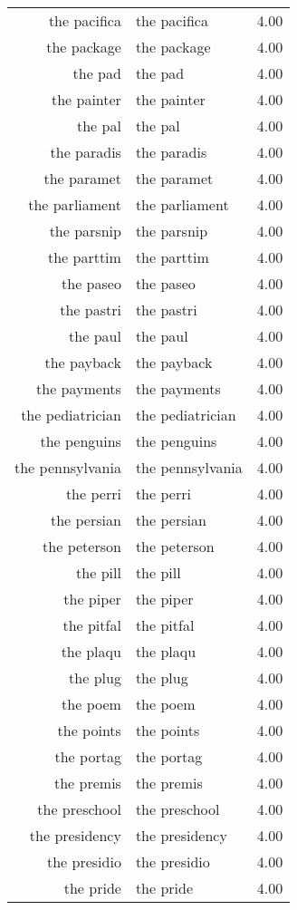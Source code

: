 \begin{table}[ht]
\begin{tabular}{rlr}
  the pacifica & the pacifica & 4.00 \\ 
  the package & the package & 4.00 \\ 
  the pad & the pad & 4.00 \\ 
  the painter & the painter & 4.00 \\ 
  the pal & the pal & 4.00 \\ 
  the paradis & the paradis & 4.00 \\ 
  the paramet & the paramet & 4.00 \\ 
  the parliament & the parliament & 4.00 \\ 
  the parsnip & the parsnip & 4.00 \\ 
  the parttim & the parttim & 4.00 \\ 
  the paseo & the paseo & 4.00 \\ 
  the pastri & the pastri & 4.00 \\ 
  the paul & the paul & 4.00 \\ 
  the payback & the payback & 4.00 \\ 
  the payments & the payments & 4.00 \\ 
  the pediatrician & the pediatrician & 4.00 \\ 
  the penguins & the penguins & 4.00 \\ 
  the pennsylvania & the pennsylvania & 4.00 \\ 
  the perri & the perri & 4.00 \\ 
  the persian & the persian & 4.00 \\ 
  the peterson & the peterson & 4.00 \\ 
  the pill & the pill & 4.00 \\ 
  the piper & the piper & 4.00 \\ 
  the pitfal & the pitfal & 4.00 \\ 
  the plaqu & the plaqu & 4.00 \\ 
  the plug & the plug & 4.00 \\ 
  the poem & the poem & 4.00 \\ 
  the points & the points & 4.00 \\ 
  the portag & the portag & 4.00 \\ 
  the premis & the premis & 4.00 \\ 
  the preschool & the preschool & 4.00 \\ 
  the presidency & the presidency & 4.00 \\ 
  the presidio & the presidio & 4.00 \\ 
  the pride & the pride & 4.00 \\ 

\end{tabular}
\end{table}
